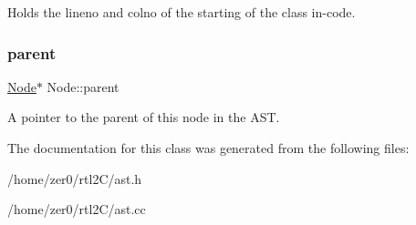 Holds the lineno and colno of the starting of the class in-\/code. \mbox{\label{class_node_ad8184598cdea70e4bbdfd76f2b0f9e85}} 
\subsubsection{\texorpdfstring{parent}{parent}}
{\footnotesize\ttfamily \hyperlink{class_node}{Node}$\ast$ Node\+::parent\hspace{0.3cm}{\ttfamily [protected]}}

A pointer to the parent of this node in the A\+ST. 

The documentation for this class was generated from the following files\+:\begin{DoxyCompactItemize}
\item 
/home/zer0/rtl2\+C/ast.\+h\item 
/home/zer0/rtl2\+C/ast.\+cc\end{DoxyCompactItemize}
